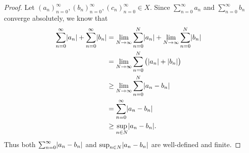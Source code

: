 \begin{proof}
  Let \((a_n)_{n = 0}^\infty, (b_n)_{n = 0}^\infty, (c_n)_{n = 0}^\infty \in X\).
  Since \(\sum_{n = 0}^\infty a_n\) and \(\sum_{n = 0}^\infty b_n\) converge absolutely, we know that
  \begin{align*}
    \sum_{n = 0}^\infty \abs{a_n} + \sum_{n = 0}^\infty \abs{b_n} & = \lim_{N \to \infty} \sum_{n = 0}^N \abs{a_n} + \lim_{N \to \infty} \sum_{n = 0}^N \abs{b_n} \\
                                                                  & = \lim_{N \to \infty} \sum_{n = 0}^N \big(\abs{a_n} + \abs{b_n}\big)                          \\
                                                                  & \geq \lim_{N \to \infty} \sum_{n = 0}^N \abs{a_n - b_n}                                       \\
                                                                  & = \sum_{n = 0}^\infty \abs{a_n - b_n}                                                         \\
                                                                  & \geq \sup_{n \in N} \abs{a_n - b_n}.
  \end{align*}
  Thus both \(\sum_{n = 0}^\infty \abs{a_n - b_n}\) and \(\sup_{n \in N} \abs{a_n - b_n}\) are well-defined and finite.


\end{proof}
